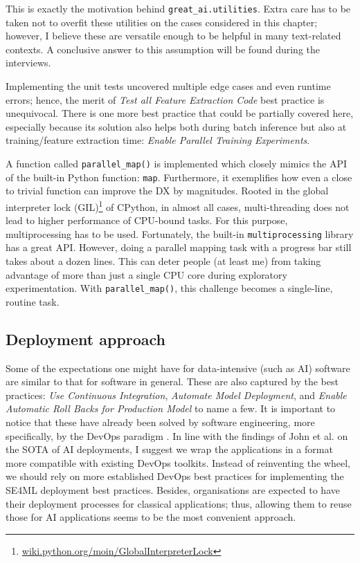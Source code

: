 This is exactly the motivation behind \texttt{great\_ai.utilities}. Extra care has to be taken not to overfit these utilities on the cases considered in this chapter; however, I believe these are versatile enough to be helpful in many text-related contexts. A conclusive answer to this assumption will be found during the interviews.

Implementing the unit tests uncovered multiple edge cases and even runtime errors; hence, the merit of \textit{Test all Feature Extraction Code} best practice is unequivocal. There is one more best practice that could be partially covered here, especially because its solution also helps both during batch inference but also at training/feature extraction time: \textit{Enable Parallel Training Experiments}.

A function called \texttt{parallel\_map()} is implemented which closely mimics the API of the built-in Python function: \texttt{map}. Furthermore, it exemplifies how even a close to trivial function can improve the DX by magnitudes. Rooted in the global interpreter lock (GIL)\footnote{\href{https://wiki.python.org/moin/GlobalInterpreterLock}{wiki.python.org/moin/GlobalInterpreterLock}} of CPython, in almost all cases, multi-threading does not lead to higher performance of CPU-bound tasks. For this purpose, multiprocessing has to be used. Fortunately, the built-in \texttt{multiprocessing} library has a great API. However, doing a parallel mapping task with a progress bar still takes about a dozen lines. This can deter people (at least me) from taking advantage of more than just a single CPU core during exploratory experimentation. With \texttt{parallel\_map()}, this challenge becomes a single-line, routine task. 

\subsection{Deployment approach}

Some of the expectations one might have for data-intensive (such as AI) software are similar to that for software in general. These are also captured by the best practices: \textit{Use Continuous Integration}, \textit{Automate Model Deployment}, and \textit{Enable Automatic Roll Backs for Production Model} to name a few. It is important to notice that these have already been solved by software engineering, more specifically, by the DevOps paradigm \cite{leite2019survey}. 
In line with the findings of John et al. \cite{john2020architecting} on the SOTA of AI deployments, I suggest we wrap the applications in a format more compatible with existing DevOps toolkits. Instead of reinventing the wheel, we should rely on more established DevOps best practices for implementing the SE4ML deployment best practices. Besides, organisations are expected to have their deployment processes for classical applications; thus, allowing them to reuse those for AI applications seems to be the most convenient approach.

